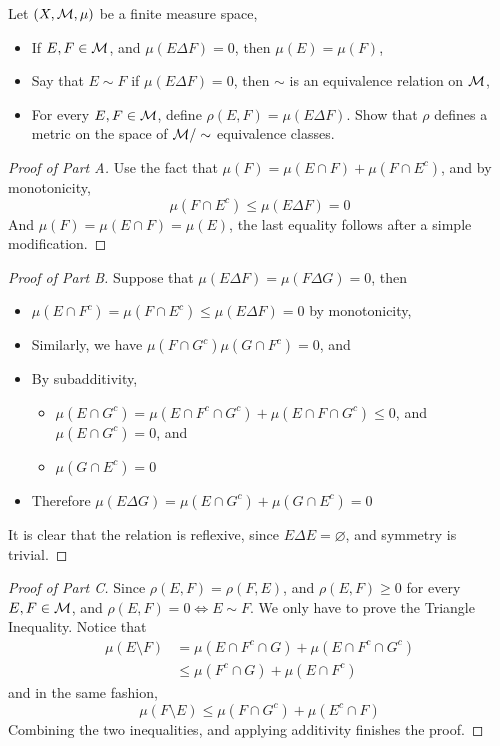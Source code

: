 \documentclass[../../main.tex]{subfiles}
\begin{document}
\begin{wts}
Let $(X,\mathcal{M},\mu)$ be a finite measure space,
\begin{itemize}
    \item If $E,F\in\mathcal{M}$, and $\mu(E\Delta F)=0$, then $\mu(E)=\mu(F)$,
    \item Say that $E\sim F$ if $\mu(E\Delta F)=0$, then $\sim$ is an equivalence relation on $\mathcal{M}$,
    \item For every $E,F\in\mathcal{M}$, define $\rho(E,F)=\mu(E\Delta F)$. Show that $\rho$ defines a metric on the space of $\mathcal{M}/\sim$ equivalence classes.
\end{itemize}
\end{wts}
\begin{proof}[Proof of Part A]
    Use the fact that $\mu(F)=\mu(E\cap F)+\mu(F\cap E^c)$, and by monotonicity,
    \[
    \mu(F\cap E^c)\leq \mu(E\Delta F)=0
    \]
    And $\mu(F)=\mu(E\cap F)=\mu(E)$, the last equality follows after a simple modification.
\end{proof}
\begin{proof}[Proof of Part B]
    Suppose that $\mu(E\Delta F)=\mu(F\Delta G)=0$, then
    \begin{itemize}
        \item $\mu(E\cap F^c)=\mu(F\cap E^c)\leq \mu(E\Delta F)=0$ by monotonicity,
        \item Similarly, we have $\mu(F\cap G^c)\mu(G\cap F^c)=0$, and
        \item By subadditivity, 
        \begin{itemize}
            \item $\mu(E\cap G^c)=\mu(E\cap F^c\cap G^c) + \mu(E\cap F\cap G^c)\leq 0$, and $\mu(E\cap G^c)=0$, and
            \item $\mu(G\cap E^c)=0$
        \end{itemize}
        \item Therefore $\mu(E\Delta G)=\mu(E\cap G^c) + \mu(G\cap E^c)=0$
    \end{itemize}
    It is clear that the relation is reflexive, since $E\Delta E =\varnothing$, and symmetry is trivial.
\end{proof}
\begin{proof}[Proof of Part C]
    Since $\rho(E,F)=\rho(F,E)$, and $\rho(E,F)\geq 0$ for every $E,F\in\mathcal{M}$, and $\rho(E,F)=0\iff E\sim F$. We only have to prove the Triangle Inequality. Notice that
    \begin{align*}
    \mu(E\setminus F) &= \mu(E\cap F^c\cap G) + \mu(E\cap F^c\cap G^c)\\
    &\leq \mu(F^c\cap G) + \mu(E\cap F^c)
    \end{align*}
    and in the same fashion,
    \[
    \mu(F\setminus E) \leq \mu(F\cap G^c) + \mu(E^c\cap F)
    \]
    Combining the two inequalities, and applying additivity finishes the proof.
\end{proof}
\newpage
\end{document}
